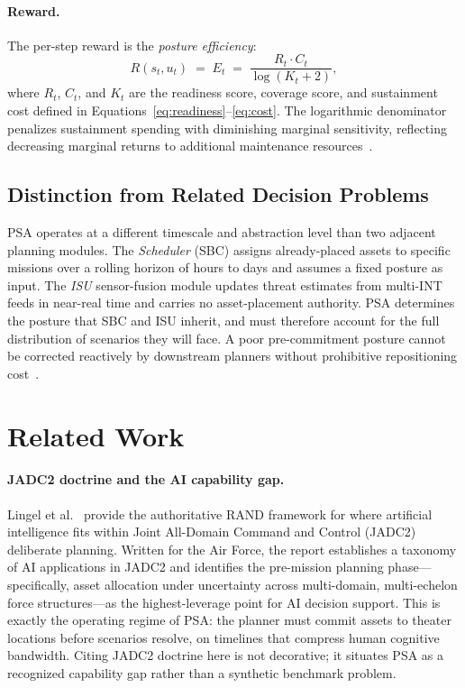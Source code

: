 \documentclass[11pt]{article}
\begin{document}
\paragraph{Reward.}
The per-step reward is the \emph{posture efficiency}:
\begin{equation}
    R(s_t, u_t) \;=\; E_t \;=\;
    \frac{R_t \cdot C_t}{\log(K_t + 2)},
    \label{eq:reward}
\end{equation}
where $R_t$, $C_t$, and $K_t$ are the readiness score, coverage score,
and sustainment cost defined in
Equations~\eqref{eq:readiness}--\eqref{eq:cost}.
The logarithmic denominator penalizes sustainment spending with
diminishing marginal sensitivity, reflecting decreasing marginal returns
to additional maintenance resources~\cite{powell2011}.

\subsection{Distinction from Related Decision Problems}

PSA operates at a different timescale and abstraction level than two
adjacent planning modules. The \emph{Scheduler} (SBC) assigns
already-placed assets to specific missions over a rolling horizon of
hours to days and assumes a fixed posture as input. The \emph{ISU}
sensor-fusion module updates threat estimates from multi-INT feeds in
near-real time and carries no asset-placement authority. PSA determines
the posture that SBC and ISU inherit, and must therefore account for the
full distribution of scenarios they will face. A poor pre-commitment
posture cannot be corrected reactively by downstream planners without
prohibitive repositioning cost~\cite{salmeron2010}.


\section{Related Work}
\label{sec:related}

\paragraph{JADC2 doctrine and the AI capability gap.}
Lingel et al.~\cite{lingel2020} provide the authoritative RAND framework
for where artificial intelligence fits within Joint All-Domain Command
and Control (JADC2) deliberate planning. Written for the Air Force, the
report establishes a taxonomy of AI applications in JADC2 and identifies
the pre-mission planning phase---specifically, asset allocation under
uncertainty across multi-domain, multi-echelon force structures---as the
highest-leverage point for AI decision support. This is exactly the
operating regime of PSA: the planner must commit assets to theater
locations before scenarios resolve, on timelines that compress human
cognitive bandwidth. Citing JADC2 doctrine here is not decorative; it
situates PSA as a recognized capability gap rather than a synthetic
benchmark problem.
\end{document}
